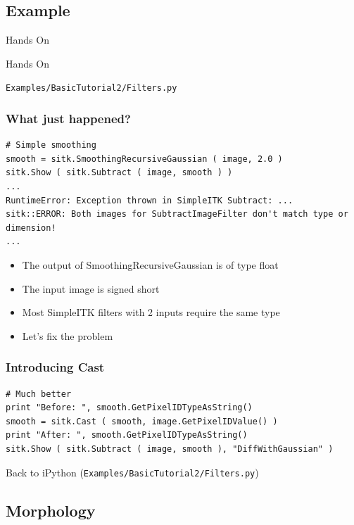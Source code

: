 \subsection{Example}
\begin{frame}{Hands On}
\fontsize{36pt}{36pt}\selectfont
\center
\begin{center}
Hands On
\end{center}
\vspace{20pt}
\begin{center}
\fontsize{11pt}{11pt}\selectfont
\texttt{Examples/BasicTutorial2/Filters.py}
\end{center}
\end{frame}

\begin{frame}[fragile]
\frametitle{What just happened?}
\lstpython
\begin{lstlisting}
# Simple smoothing
smooth = sitk.SmoothingRecursiveGaussian ( image, 2.0 )
sitk.Show ( sitk.Subtract ( image, smooth ) )
...
RuntimeError: Exception thrown in SimpleITK Subtract: ...
sitk::ERROR: Both images for SubtractImageFilter don't match type or dimension!
...
\end{lstlisting}

\begin{itemize}
  \item The output of SmoothingRecursiveGaussian is of type float
  \item The input image is signed short
  \item Most SimpleITK filters with 2 inputs require the same type
  \item Let's fix the problem
\end{itemize}

\end{frame}

\begin{frame}[fragile]
\frametitle{Introducing Cast}
\lstpython
\begin{lstlisting}
# Much better
print "Before: ", smooth.GetPixelIDTypeAsString()
smooth = sitk.Cast ( smooth, image.GetPixelIDValue() )
print "After: ", smooth.GetPixelIDTypeAsString()
sitk.Show ( sitk.Subtract ( image, smooth ), "DiffWithGaussian" )
\end{lstlisting}
Back to iPython (\texttt{Examples/BasicTutorial2/Filters.py})
\end{frame}

\subsection{Morphology}

